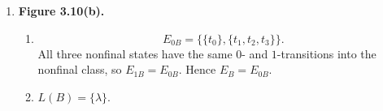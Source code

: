 \begin{enumerate}[{3.}1.]
\begin{enumerate}
\item $A_{R_{L(A)}}$ has five states, represented by the classes of
$\lambda,\ 1,\ 0,\ 00,$ and $01$. Writing these as
$[\lambda], [1], [0], [00], [01]$, the transitions are
\[
\begin{array}{c|cc}
 & 0 & 1\\\hline
{}[\lambda] & [0] & [1]\\
{}[1] & [01] & [00]\\
{}[0] & [00] & [01]\\
{}[00] & [00] & [00]\\
{}[01] & [01] & [01]
\end{array}
\]
with final states $[\lambda], [1], [00]$. Here $[11]=[00]$ and
$[10]=[01]$.

\item The right-congruence classes of $R_{L(A)}$ may be written as
\[
[\lambda],\qquad [1],\qquad [0],\qquad [00]=[11],\qquad [01]=[10].
\]
Equivalently, they are
\[
\{\lambda\},\quad \{1\},\quad \{0\},\quad \{x:|x|\geq 2\text{ and the first two symbols are equal}\},
\]
and
\[
\{x:|x|\geq 2\text{ and the first two symbols are different}\}.
\]

\item $A/_{E_A}$ has states
\[
[q_0],\ [q_1],\ [q_2],\ [q_3]=[q_6],\ [q_4]=[q_5],
\]
with $[q_0]$ initial and final states $[q_0], [q_1], [q_3]=[q_6]$. Its
transition table is
\[
\begin{array}{c|cc}
 & 0 & 1\\\hline
{}[q_0] & [q_2] & [q_1]\\
{}[q_1] & [q_4]=[q_5] & [q_3]=[q_6]\\
{}[q_2] & [q_3]=[q_6] & [q_4]=[q_5]\\
{}[q_3]=[q_6] & [q_3]=[q_6] & [q_3]=[q_6]\\
{}[q_4]=[q_5] & [q_4]=[q_5] & [q_4]=[q_5]
\end{array}
\]
so $A/_{E_A}\cong A_{R_{L(A)}}$.
\end{enumerate}

\item \textbf{Figure 3.10(b).}

\begin{enumerate}
\item
\[
E_{0B}=\{\{t_0\},\{t_1,t_2,t_3\}\}.
\]
All three nonfinal states have the same $0$- and $1$-transitions into the
nonfinal class, so $E_{1B}=E_{0B}$. Hence $E_B=E_{0B}$.

\item $L(B)=\{\lambda\}$.


\end{enumerate}
\end{enumerate}
